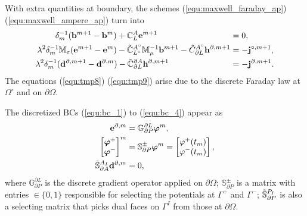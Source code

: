 \documentclass{report}
\begin{document}
With extra quantities at boundary, the schemes (\ref{equ:maxwell_faraday_ap}) (\ref{equ:maxwell_ampere_ap}) turn into
\begin{align}
    \delta_m^{-1} (\mathbf{b}^{m+1} - \mathbf{b}^{m}) + \mathbb{C}_L^A\mathbf{e}^{m+1} \hspace{3.08cm}&= 0, \label{equ:tmp7}\\
    \lambda^2\delta_m^{-1}\mathbb{M}_\varepsilon(\mathbf{e}^{m+1} - \mathbf{e}^m) - \Tilde{\mathbb{C}}_{L^\circ}^{A^\circ}\mathbb{M}_\mu^{-1}\mathbf{b}^{m+1} - \Tilde{C}^{A^\circ}_{\partial L} \mathbf{h}^{\partial, m+1} &= - \mathbf{j}^{\circ,m+1}, \label{equ:tmp8}\\
     \lambda^2\delta_m^{-1}(\mathbf{d}^{\partial,m+1} - \mathbf{d}^{\partial, m}) - \Tilde{\mathbb{C}}^{\partial A}_{\partial L} \mathbf{h}^{\partial,m+1} \hspace{2.60cm}&= - \mathbf{j}^{\partial,m+1}. \label{equ:tmp9}
\end{align}
The equations (\ref{equ:tmp8}) (\ref{equ:tmp9}) arise due to the discrete Faraday law at $\Omega^\circ$ and on $\partial \Omega$. 

The discretized BCs (\ref{equ:bc_1}) to (\ref{equ:bc_4}) appear as
\begin{align}
    \mathbf{e}^{\partial,m} &= \mathbb{G}^{\partial L}_{\partial P} \bm{\varphi}^m, \label{equ:tmp10}\\
    \begin{bmatrix}
    \bm{\varphi}^+ \\
    \bm{\varphi}^- 
    \end{bmatrix}^m &= \mathbb{S}^{\pm}_{\partial P} \bm{\varphi}^m =
    \begin{bmatrix}
    \varphi^+(t_m) \\
    \varphi^-(t_m) 
    \end{bmatrix},\label{equ:tmp11}\\
    \Tilde{\mathbb{S}}^{A_I}_{\partial A} \mathbf{d}^{\partial,m} &= 0, \label{equ:tmp12}
\end{align}
where $\mathbb{G}^{\partial L}_{\partial P}$ is the discrete gradient operator applied on $\partial \Omega$;
$\mathbb{S}^{\pm}_{\partial P}$ is a matrix with entries $\in \{0,1\}$ responsible for selecting the potentials at $\Gamma^+$ and $\Gamma^-$; $\Tilde{\mathbb{S}}^{P_I}_{\partial P}$ is also a selecting matrix that picks dual faces on $\Gamma^I$ from those at $\partial\Omega$. 
\end{document}
